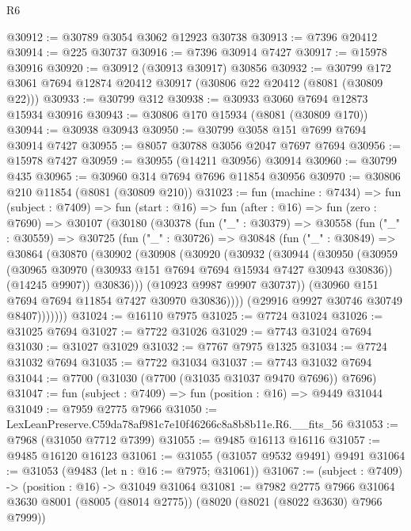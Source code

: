 \begin{lexlean}{R6}
\begin{coremodule}
@30912 := @30789 @3054 @3062 @12923 @30738
@30913 := @7396 @20412
@30914 := @225 @30737
@30916 := @7396 @30914 @7427
@30917 := @15978 @30916
@30920 := @30912 (@30913 @30917) @30856
@30932 := @30799 @172 @3061 @7694 @12874 @20412 @30917 (@30806 @22 @20412 (@8081 (@30809 @22)))
@30933 := @30799 @312
@30938 := @30933 @3060 @7694 @12873 @15934 @30916
@30943 := @30806 @170 @15934 (@8081 (@30809 @170))
@30944 := @30938 @30943
@30950 := @30799 @3058 @151 @7699 @7694 @30914 @7427
@30955 := @8057 @30788 @3056 @2047 @7697 @7694
@30956 := @15978 @7427
@30959 := @30955 (@14211 @30956) @30914
@30960 := @30799 @435
@30965 := @30960 @314 @7694 @7696 @11854 @30956
@30970 := @30806 @210 @11854 (@8081 (@30809 @210))
@31023 := fun (machine : @7434) =>
  fun (subject : @7409) =>
  fun (start : @16) =>
  fun (after : @16) =>
  fun (zero : @7690) =>
  @30107
    (@30180
      (@30378
        (fun ("_" : @30379) =>
        @30558
          (fun ("_" : @30559) =>
          @30725
            (fun ("_" : @30726) =>
            @30848
              (fun ("_" : @30849) =>
              @30864
                (@30870
                  (@30902
                    (@30908
                      (@30920
                        (@30932
                          (@30944
                            (@30950
                              (@30959
                                (@30965 @30970 (@30933 @151 @7694 @7694 @15934 @7427 @30943 @30836))
                                (@14245 @9907))
                              @30836)))
                        (@10923 @9987 @9907 @30737))
                      (@30960 @151 @7694 @7694 @11854 @7427 @30970 @30836))))
                (@29916 @9927 @30746 @30749 @8407)))))))
@31024 := @16110 @7975
@31025 := @7724 @31024
@31026 := @31025 @7694
@31027 := @7722 @31026
@31029 := @7743 @31024 @7694
@31030 := @31027 @31029
@31032 := @7767 @7975 @1325
@31034 := @7724 @31032 @7694
@31035 := @7722 @31034
@31037 := @7743 @31032 @7694
@31044 := @7700 (@31030 (@7700 (@31035 @31037 @9470 @7696)) @7696)
@31047 := fun (subject : @7409) => fun (position : @16) => @9449 @31044
@31049 := @7959 @2775 @7966
@31050 := LexLeanPreserve.C59da78af981c7e10f46266c8a8b8b11e.R6.__fits_56
@31053 := @7968 (@31050 @7712 @7399)
@31055 := @9485 @16113 @16116
@31057 := @9485 @16120 @16123
@31061 := @31055 (@31057 @9532 @9491) @9491
@31064 := @31053 (@9483 (let n : @16 := @7975; @31061))
@31067 := (subject : @7409) -> (position : @16) -> @31049 @31064
@31081 := @7982
    @2775
    @7966
    @31064
    @3630
    @8001
    (@8005 (@8014 @2775))
    (@8020 (@8021 (@8022 @3630) @7966 @7999))

\end{coremodule}
\end{lexlean}
